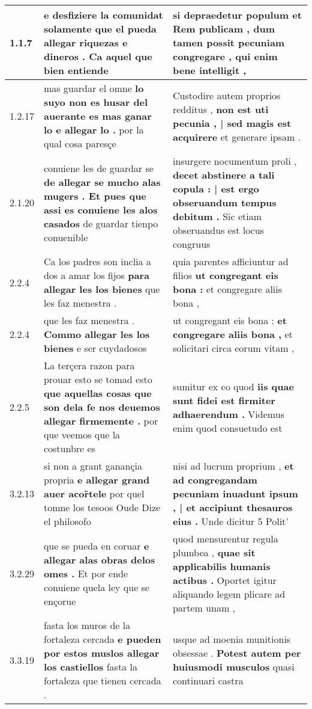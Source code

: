 \begin{tabular}{|p{1cm}|p{6.5cm}|p{6.5cm}|}

\hline
1.1.7 & e desfiziere la comunidat solamente \textbf{ que el pueda allegar riquezas e dineros . } Ca aquel que bien entiende & si depraedetur populum et Rem publicam , \textbf{ dum tamen possit pecuniam congregare , } qui enim bene intelligit , \\\hline
1.2.17 & mas guardar el omne \textbf{ lo suyo non es husar del auerante es mas ganar lo e allegar lo . } por la qual cosa paresçe & Custodire autem proprios redditus , \textbf{ non est uti pecunia , | sed magis est acquirere } et generare ipsam . \\\hline
2.1.20 & conuiene les de guardar se \textbf{ de allegar se mucho alas mugers . Et pues que assi es conuiene les alos casados } de guardar tienpo conuenible & insurgere nocumentum proli , \textbf{ decet abstinere a tali copula : | est ergo obseruandum tempus debitum . } Sic etiam obseruandus est locus congruus \\\hline
2.2.4 & Ca los padres son inclia a dos a amar los fijos \textbf{ para allegar les los bienes } que les faz menestra . & quia parentes afficiuntur ad filios \textbf{ ut congregant eis bona : } et congregare aliis bona , \\\hline
2.2.4 & que les faz menestra . \textbf{ Commo allegar les los bienes } e ser cuydadosos & ut congregant eis bona : \textbf{ et congregare aliis bona , } et solicitari circa eorum vitam , \\\hline
2.2.5 & La terçera razon para prouar esto se tomad esto \textbf{ que aquellas cosas que son dela fe nos deuemos allegar firmemente . } por que veemos que la costunbre es & sumitur ex eo quod \textbf{ iis quae sunt fidei est firmiter adhaerendum . } Videmus enim quod consuetudo est \\\hline
3.2.13 & si non a grant ganançia propria \textbf{ e allegar grand auer acor̃tele } por quel tomne los tesoos Oude Dize el philosofo & nisi ad lucrum proprium , \textbf{ et ad congregandam pecuniam inuadunt ipsum , | et accipiunt thesauros eius . } Unde dicitur 5 Polit’ \\\hline
3.2.29 & que se pueda en coruar \textbf{ e allegar alas obras delos omes . } Et por ende conuiene quela ley que se ençorue & quod mensurentur regula plumbea , \textbf{ quae sit applicabilis humanis actibus . } Oportet igitur aliquando legem plicare ad partem unam , \\\hline
3.3.19 & fasta los muros de la fortaleza cercada \textbf{ e pueden por estos muslos allegar los castiellos } fasta la fortaleza que tienen cercada . & usque ad moenia munitionis obsessae . \textbf{ Potest autem per huiusmodi musculos } quasi continuari castra \\\hline

\end{tabular}
